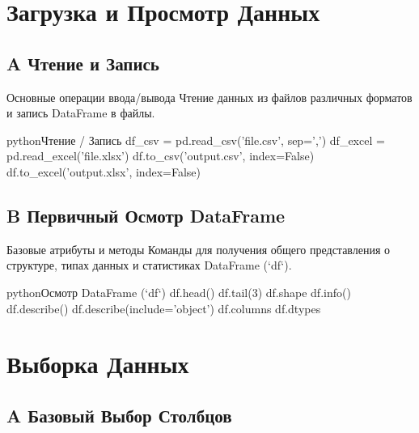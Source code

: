 
\section{Загрузка и Просмотр Данных}

\subsection{A Чтение и Запись}

\begin{myblock}{Основные операции ввода/вывода}
    Чтение данных из файлов различных форматов и запись DataFrame в файлы.
    \begin{codebox}{python}{Чтение / Запись}
    df_csv = pd.read_csv('file.csv', sep=',')
    df_excel = pd.read_excel('file.xlsx')
    df.to_csv('output.csv', index=False)
    df.to_excel('output.xlsx', index=False)
    \end{codebox}
\end{myblock}

\subsection{B Первичный Осмотр DataFrame}

\begin{myblock}{Базовые атрибуты и методы}
    Команды для получения общего представления о структуре, типах данных и статистиках DataFrame (`df`).
    \begin{codebox}{python}{Осмотр DataFrame (`df`)}
    df.head()
    df.tail(3)
    df.shape
    df.info()
    df.describe()
    df.describe(include='object')
    df.columns
    df.dtypes
    \end{codebox}
\end{myblock}

\section{Выборка Данных}

\subsection{A Базовый Выбор Столбцов}

